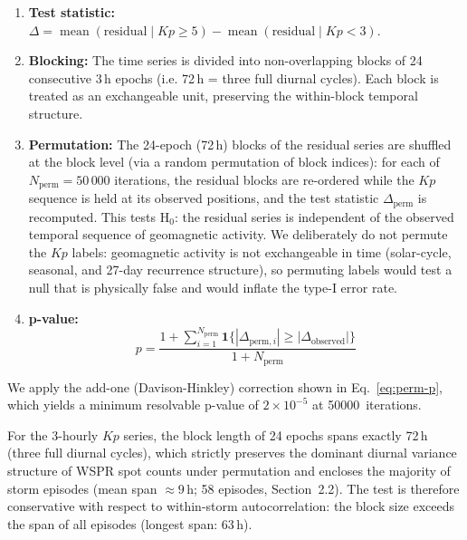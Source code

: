 \documentclass{agujournal2019}
\begin{document}
\begin{enumerate}
	\item \textbf{Test statistic:}
	      $\Delta = \operatorname{mean}(\text{residual} \mid Kp \ge 5)
		      - \operatorname{mean}(\text{residual} \mid Kp < 3)$.
	\item \textbf{Blocking:} The time series is divided into non-overlapping
	      blocks of 24 consecutive 3\,h epochs (i.e. 72\,h = three full
	      diurnal cycles). Each block is treated as an exchangeable unit,
	      preserving the within-block temporal structure.
	\item \textbf{Permutation:} The 24-epoch (72\,h) blocks of the residual
	      series are shuffled at the block level (via a random permutation
	      of block indices): for each of $N_{\text{perm}} = 50\,000$
	      iterations, the residual blocks are re-ordered while the $Kp$
	      sequence is held at its observed positions, and the test
	      statistic $\Delta_{\text{perm}}$ is recomputed. This tests
	      H$_0$: the residual series is independent of the observed
	      temporal sequence of geomagnetic activity. We deliberately do
	      not permute the $Kp$ labels: geomagnetic activity is not
	      exchangeable in time (solar-cycle, seasonal, and 27-day
	      recurrence structure), so permuting labels would test a null
	      that is physically false and would inflate the type-I error
	      rate.
	\item \textbf{p-value:}
	      \begin{equation}
		      p = \frac{1 + \sum_{i=1}^{N_{\text{perm}}}
			      \mathbf{1}\{ |\Delta_{\text{perm}, i}| \ge |\Delta_{\text{observed}}| \}}
			      {1 + N_{\text{perm}}}
		      \label{eq:perm-p}
	      \end{equation}
\end{enumerate}

We apply the add-one (Davison-Hinkley) correction shown in
Eq.~\eqref{eq:perm-p}, which yields a minimum resolvable
p-value of $2 \times 10^{-5}$ at \SI{50000}{iterations}.

For the 3-hourly $Kp$ series, the block length of 24 epochs spans
exactly 72\,h (three full diurnal cycles), which strictly preserves the
dominant diurnal variance structure of WSPR spot counts under
permutation and encloses the majority of storm episodes (mean span
$\approx 9$\,h; 58 episodes, Section~2.2). The test is therefore
conservative with respect to within-storm autocorrelation: the block
size exceeds the span of all episodes (longest span: 63\,h).
\end{document}
